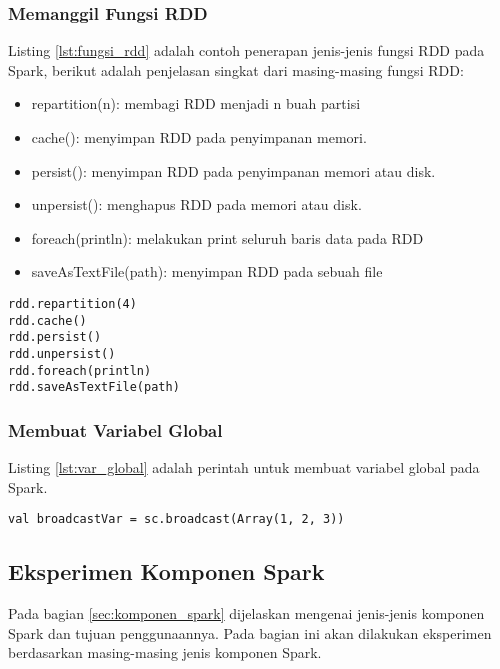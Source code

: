 \subsubsection{Memanggil Fungsi RDD}
\noindent Listing \ref{lst:fungsi_rdd} adalah contoh penerapan jenis-jenis fungsi RDD pada Spark, berikut adalah penjelasan singkat dari masing-masing fungsi RDD:

\begin{itemize}
\item repartition(n): membagi RDD menjadi n buah partisi
\item cache(): menyimpan RDD pada penyimpanan memori.
\item persist(): menyimpan RDD pada penyimpanan memori atau disk.
\item unpersist(): menghapus RDD pada memori atau disk.
\item foreach(println): melakukan print seluruh baris data pada RDD
\item saveAsTextFile(path): menyimpan RDD pada sebuah file
\end{itemize}

\begin{lstlisting}[basicstyle=\ttfamily, frame=single,
	columns=fullflexible, keepspaces=true, breaklines=true, label=lst:fungsi_rdd, caption=Contoh Fungsi RDD]
rdd.repartition(4)
rdd.cache() 
rdd.persist() 
rdd.unpersist()
rdd.foreach(println)
rdd.saveAsTextFile(path)

\end{lstlisting}

\subsubsection{Membuat Variabel Global}
\noindent Listing \ref{lst:var_global} adalah perintah untuk membuat variabel global pada Spark.
\begin{lstlisting}[basicstyle=\ttfamily, frame=single,
	columns=fullflexible, keepspaces=true, breaklines=true, label=lst:var_global, caption=Membuat Variabel Global]
val broadcastVar = sc.broadcast(Array(1, 2, 3))
\end{lstlisting}	

\newpage
\subsection{Eksperimen Komponen Spark}
Pada bagian \ref{sec:komponen_spark} dijelaskan mengenai jenis-jenis komponen Spark dan tujuan penggunaannya. Pada bagian ini akan dilakukan eksperimen berdasarkan masing-masing jenis komponen Spark.

